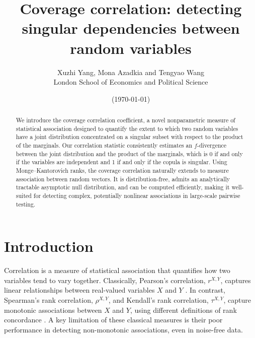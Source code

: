 \documentclass[11pt]{article}
\title{Coverage correlation: detecting singular dependencies between random variables}
\author{Xuzhi Yang, Mona Azadkia and Tengyao Wang\\[3pt]
London School of Economics and Political Science}
\date{(\today)}
\begin{document}
\maketitle

\begin{abstract}
We introduce the coverage correlation coefficient, a novel nonparametric measure of statistical association designed to quantify the extent to which two random variables have a joint distribution concentrated on a singular subset with respect to the product of the marginals. Our correlation statistic consistently estimates an $f$-divergence between the joint distribution and the product of the marginals, which is 0 if and only if the variables are independent and 1 if and only if the copula is singular. Using Monge--Kantorovich ranks, the coverage correlation naturally extends to measure association between random vectors. It is distribution-free, admits an analytically tractable asymptotic null distribution, and can be computed efficiently, making it well-suited for detecting complex, potentially nonlinear associations in large-scale pairwise testing.
\end{abstract}

\section{Introduction}
Correlation is a measure of statistical association that quantifies how two variables tend to vary together. Classically, Pearson's correlation, $r^{X,Y}$, captures linear relationships between real-valued variables $X$ and $Y$ \citep{pearsonhistory}. In contrast, Spearman's rank correlation, $\rho^{X,Y}$, and Kendall's rank correlation, $\tau^{X,Y}$, capture monotonic associations between $X$ and $Y$, using different definitions of rank concordance \citep{spearman1904proof,kendall1938new}. A key limitation of these classical measures is their poor performance in detecting non-monotonic associations, even in noise-free data.
\end{document}
